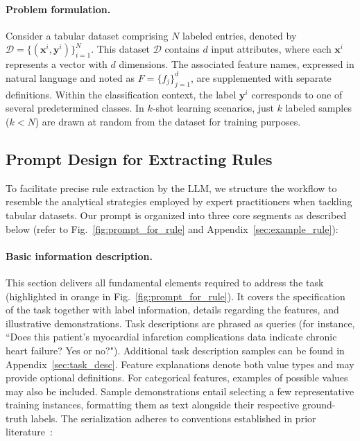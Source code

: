 \vspace*{-0.12in}
\paragraph{Problem formulation.} Consider a tabular dataset comprising $N$ labeled entries, denoted by $\mathcal{D} = \{(\mathbf{x}^i, \mathbf{y}^i)\}_{i=1}^{N}$. This dataset $\mathcal{D}$ contains $d$ input attributes, where each $\mathbf{x}^i$ represents a vector with $d$ dimensions. The associated feature names, expressed in natural language and noted as $F = \{f_j\}_{j=1}^{d}$, are supplemented with separate definitions. Within the classification context, the label $\mathbf{y}^i$ corresponds to one of several predetermined classes. In $k$-shot learning scenarios, just $k$ labeled samples ($k<N$) are drawn at random from the dataset for training purposes.

\subsection{Prompt Design for Extracting Rules}
\label{Sec:prompt_design}
To facilitate precise rule extraction by the LLM, we structure the workflow to resemble the analytical strategies employed by expert practitioners when tackling tabular datasets. Our prompt is organized into three core segments as described below (refer to Fig.~\ref{fig:prompt_for_rule} and Appendix~\ref{sec:example_rule}):

\vspace*{-0.12in}
\paragraph{Basic information description.} This section delivers all fundamental elements required to address the task (highlighted in orange in Fig.~\ref{fig:prompt_for_rule}). It covers the specification of the task together with label information, details regarding the features, and illustrative demonstrations. Task descriptions are phrased as queries (for instance, ``Does this patient's myocardial infarction complications data indicate chronic heart failure? Yes or no?"). Additional task description samples can be found in Appendix~\ref{sec:task_desc}. Feature explanations denote both value types and may provide optional definitions. For categorical features, examples of possible values may also be included. Sample demonstrations entail selecting a few representative training instances, formatting them as text alongside their respective ground-truth labels. The serialization adheres to conventions established in prior literature~\cite{dinh2022lift,hegselmann2023tabllm}:

